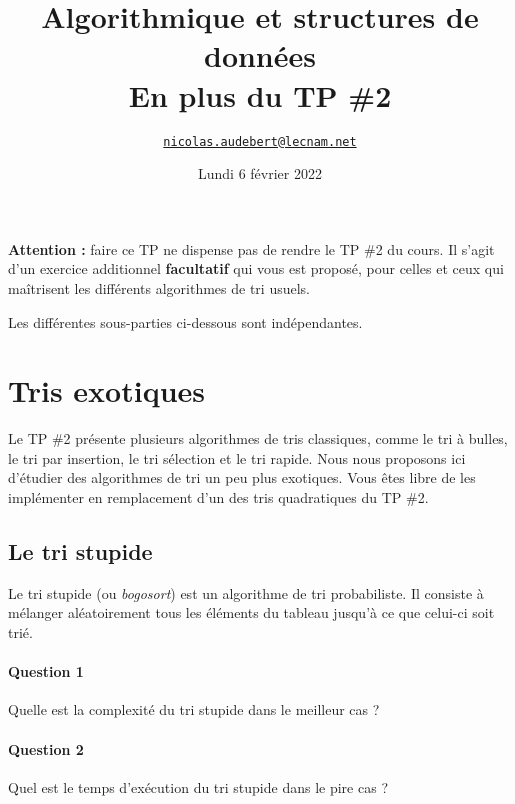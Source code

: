 \documentclass{article}%
\begin{document}
\title{Algorithmique et structures de données\\ En plus du TP \#2}
\date{Lundi 6 février 2022}

\author{\href{mailto:nicolas.audebert@lecnam.net}{\texttt{nicolas.audebert@lecnam.net}}}

\maketitle

\begin{framed}
\textbf{Attention :} faire ce TP ne dispense pas de rendre le TP \#2 du cours. Il s'agit d'un exercice additionnel \textbf{facultatif} qui vous est proposé, pour celles et ceux qui maîtrisent les différents algorithmes de tri usuels.
\end{framed}

Les différentes sous-parties ci-dessous sont indépendantes.

\section{Tris exotiques}

Le TP \#2 présente plusieurs algorithmes de tris classiques, comme le tri à bulles, le tri par insertion, le tri sélection et le tri rapide. Nous nous proposons ici d'étudier des algorithmes de tri un peu plus exotiques. Vous êtes libre de les implémenter en remplacement d'un des tris quadratiques du TP \#2.

\subsection{Le tri stupide}

Le tri stupide (ou \textit{bogosort}) est un algorithme de tri probabiliste. Il consiste à mélanger aléatoirement tous les éléments du tableau jusqu'à ce que celui-ci soit trié.

\paragraph{Question 1} Quelle est la complexité du tri stupide dans le meilleur cas ?

\paragraph{Question 2} Quel est le temps d'exécution du tri stupide dans le pire cas ?
\end{document}
